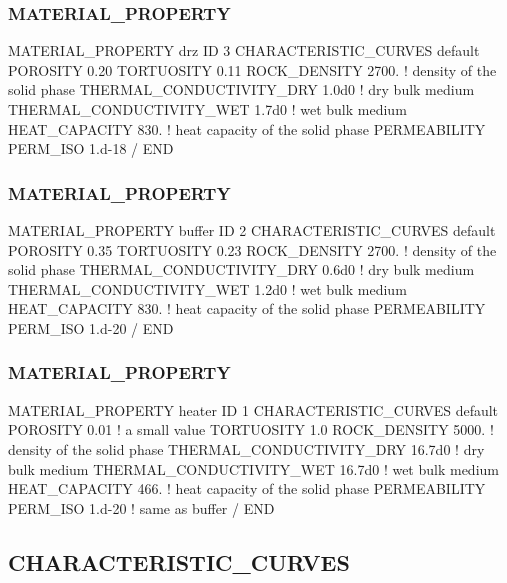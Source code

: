 \documentclass{beamer}
\newcommand\bluecomment[1]{{{\color{blue} #1}}}
\newcommand\greencomment[1]{{{\color{green} #1}}}
\begin{document}
\begin{frame}[fragile]\frametitle{MATERIAL\_PROPERTY}
\begin{semiverbatim}
MATERIAL_PROPERTY \greencomment{drz}
  ID 3
  CHARACTERISTIC_CURVES default
  POROSITY 0.20
  TORTUOSITY 0.11
  ROCK_DENSITY 2700. \bluecomment{! density of the solid phase}
  THERMAL_CONDUCTIVITY_DRY 1.0d0 \bluecomment{! dry bulk medium}
  THERMAL_CONDUCTIVITY_WET 1.7d0 \bluecomment{! wet bulk medium}
  HEAT_CAPACITY 830. \bluecomment{! heat capacity of the solid phase}
  PERMEABILITY
    PERM_ISO 1.d-18
  /
END
\end{semiverbatim}
\end{frame}

\begin{frame}[fragile]\frametitle{MATERIAL\_PROPERTY}
\begin{semiverbatim}
MATERIAL_PROPERTY \greencomment{buffer}
  ID 2
  CHARACTERISTIC_CURVES default
  POROSITY 0.35
  TORTUOSITY 0.23
  ROCK_DENSITY 2700. \bluecomment{! density of the solid phase}
  THERMAL_CONDUCTIVITY_DRY 0.6d0 \bluecomment{! dry bulk medium}
  THERMAL_CONDUCTIVITY_WET 1.2d0 \bluecomment{! wet bulk medium}
  HEAT_CAPACITY 830. \bluecomment{! heat capacity of the solid phase}
  PERMEABILITY
    PERM_ISO 1.d-20
  /
END
\end{semiverbatim}
\end{frame}

\begin{frame}[fragile]\frametitle{MATERIAL\_PROPERTY}
\begin{semiverbatim}
MATERIAL_PROPERTY \greencomment{heater}
  ID 1
  CHARACTERISTIC_CURVES default
  POROSITY 0.01 \bluecomment{! a small value}
  TORTUOSITY 1.0
  ROCK_DENSITY 5000. \bluecomment{! density of the solid phase}
  THERMAL_CONDUCTIVITY_DRY 16.7d0 \bluecomment{! dry bulk medium}
  THERMAL_CONDUCTIVITY_WET 16.7d0 \bluecomment{! wet bulk medium}
  HEAT_CAPACITY 466. \bluecomment{! heat capacity of the solid phase}
  PERMEABILITY
    PERM_ISO 1.d-20 \bluecomment{! same as buffer}
  /
END
\end{semiverbatim}
\end{frame}
\subsection{CHARACTERISTIC\_CURVES}
\end{document}
